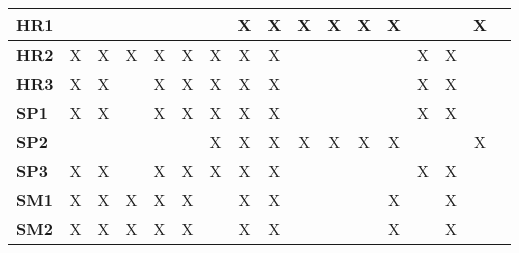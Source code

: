\documentclass[12pt]{article}
\begin{document}
\begin{table}[H]
\begin{adjustwidth}{-0.1in}{-1in}
{\begin{tabular}{c|c|c|c|c|c|c|c|c|c|c|c|c|c|c|c|c|}
\multicolumn{1}{|l|}{\textbf{HR1}}   &              &              &              &              &              &              &       X      &       X      &      X       &      X       &       X      &       X      &              &              &      X      &              \\ \hline
\multicolumn{1}{|l|}{\textbf{HR2}}   &      X       &       X      &       X      &       X      &       X      &       X      &       X      &       X      &              &              &              &              &       X      &       X      &             &              \\ \hline
\multicolumn{1}{|l|}{\textbf{HR3}}   &      X       &       X      &              &       X      &       X      &       X      &       X      &       X      &              &              &              &              &       X      &       X      &             &              \\ \hline
\multicolumn{1}{|l|}{\textbf{SP1}}   &      X       &       X      &              &       X      &       X      &       X      &       X      &       X      &              &              &              &              &       X      &       X      &             &              \\ \hline
\multicolumn{1}{|l|}{\textbf{SP2}}   &              &              &              &              &              &       X      &       X      &       X      &      X       &      X       &       X      &       X      &              &              &      X      &              \\ \hline
\multicolumn{1}{|l|}{\textbf{SP3}}   &      X       &       X      &              &       X      &       X      &       X      &       X      &       X      &              &              &              &              &       X      &       X      &             &              \\ \hline
\multicolumn{1}{|l|}{\textbf{SM1}}   &      X       &       X      &       X      &       X      &       X      &              &       X      &       X      &              &              &              &       X      &              &       X      &             &              \\ \hline
\multicolumn{1}{|l|}{\textbf{SM2}}   &      X       &       X      &       X      &       X      &       X      &              &       X      &       X      &              &              &              &       X      &              &       X      &             &              \\ \hline

\end{tabular}}
\end{adjustwidth}
\end{table}
\end{document}

